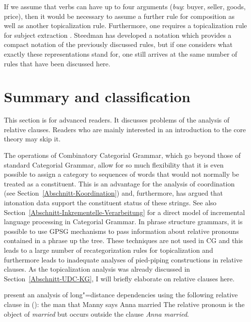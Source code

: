 \noindent
If we assume that verbs can have up to four arguments (\zb \emph{buy}: buyer,
seller, goods, price), then it would be necessary to assume a further rule for composition as well as another topicalization rule.
Furthermore, one requires a topicalization rule for subject extraction \citep[]{Pollard88a}. Steedman has developed a notation which
provides a compact notation of the previously discussed rules, but if one considers what exactly these representations stand for, one still arrives at the
same number of rules that have been discussed here.%

\section{Summary and classification}
\label{Abschnitt-Relativsaetze-CG}\label{Abschnitt-Ratte-CG}\label{sec-pied-piping-cg}

This section is for advanced readers. It discusses problems of the analysis of relative
clauses. Readers who are mainly interested in an introduction to the core theory may skip it.

The operations of Combinatory Categorial Grammar, which go beyond those of standard Categorial Grammar, allow for so much flexibility that it is even possible
to assign a category to sequences of words that would not normally be treated as a constituent. This is an advantage for the analysis of coordination
(see Section~\ref{Abschnitt-Koordination}) and, furthermore, \citet{Steedman91a} has argued that intonation data support the constituent status of these strings.
See also Section~\ref{Abschnitt-Inkrementelle-Verarbeitung} for a direct model of incremental language processing in Categorial Grammar. In phrase structure grammars,
it is possible to use GPSG mechanisms to pass information about relative pronouns contained in a phrase up the tree. These techniques are not used in CG and this leads
to a large number of recategorization rules for topicalization and furthermore leads to inadequate analyses of pied-piping constructions in relative clauses. As the
topicalization analysis was already discussed in Section~\ref{Abschnitt-UDC-KG}, I will briefly elaborate on relative clauses here.

\citet[]{SB2006a-u} present an analysis of long"=distance dependencies using the following relative clause in ():
\ea
the man  that Manny says Anna married
\z
The relative pronoun is the object of \emph{married} but occurs outside the clause \emph{Anna married}.

